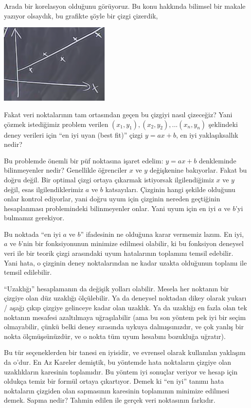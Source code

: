 \documentclass[12pt,fleqn]{article}\usepackage{../../common}
\begin{document}
Arada bir korelasyon olduğunu görüyoruz. Bu konu hakkında bilimsel bir makale
yazıyor olsaydık, bu grafikte şöyle bir çizgi çizerdik,

\begin{center}
\includegraphics[height=4cm]{9_6.png}
\end{center}

Fakat veri noktalarının tam ortasından geçen bu çizgiyi nasıl çizeceğiz?  Yani
çözmek istediğimiz problem verilen $(x_1,y_1), (x_2,y_2),...(x_n,y_n)$
şeklindeki deney verileri için ``en iyi uyan (best fit)'' çizgi $y=ax + b$, en
iyi yaklaşıksallık nedir?

Bu problemde önemli bir püf noktasına işaret edelim: $y=ax + b$ denkleminde
bilinmeyenler nedir? Genellikle öğrenciler $x$ ve $y$ değişkenine
bakıyorlar. Fakat bu doğru değil. Bir optimal çizgi ortaya çıkarmak istiyorsak
ilgilendiğimiz $x$ ve $y$ değil, esas ilgilendiklerimiz $a$ ve $b$
katsayıları. Çizginin hangi şekilde olduğunu onlar kontrol ediyorlar, yani doğru
uyum için çizginin nereden geçtiğinin hesaplanması problemindeki bilinmeyenler
onlar. Yani uyum için en iyi $a$ ve $b$'yi bulmamız gerekiyor.

Bu noktada ``en iyi $a$ ve $b$'' ifadesinin ne olduğuna karar vermemiz
lazım. En iyi, $a$ ve $b$'nin bir fonksiyonunun minimize edilmesi olabilir,
ki bu fonksiyon deneysel veri ile bir teorik çizgi arasındaki uyum
hatalarının toplamını temsil edebilir. Yani hata, o çizginin deney
noktalarından ne kadar uzakta olduğunun toplamı ile temsil edilebilir.

``Uzaklığı'' hesaplamanın da değişik yolları olabilir. Mesela her noktanın
bir çizgiye olan düz uzaklığı ölçülebilir. Ya da deneysel noktadan dikey
olarak yukarı / aşağı çıkıp çizgiye gelinceye kadar olan uzaklık. Ya da
uzaklığı en fazla olan tek noktanın mesafesi azaltılmaya uğraşılabilir (ama
bu son yöntem pek iyi bir seçim olmayabilir, çünkü belki deney sırasında
uykuya dalmışsınızdır, ve çok yanlış bir nokta ölçmüşsünüzdür, ve o nokta
tüm uyum hesabını bozukluğa uğratır).

Bu tür seçeneklerden bir tanesi en iyisidir, ve evrensel olarak kullanılan
yaklaşım da o'dur. En Az Kareler demiştik, bu yöntemde hata noktaların
çizgiye olan uzaklıkların karesinin toplamıdır. Bu yöntem iyi sonuçlar
veriyor ve hesap için oldukça temiz bir formül ortaya çıkartıyor. Demek ki
``en iyi'' tanımı hata noktaların çizgiden olan sapmasının karesinin
toplamının minimize edilmesi demek. Sapma nedir? Tahmin edilen ile gerçek
veri noktasının farkıdır. 
\end{document}
